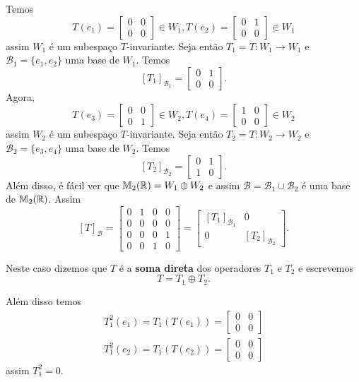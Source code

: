 Temos
\[
    T(e_1) = \begin{bmatrix}
        0 & 0\\
        0 & 0
    \end{bmatrix} \in W_1,
    T(e_2) = \begin{bmatrix}
        0 & 1\\
        0 & 0
    \end{bmatrix} \in W_1
\]
assim $W_1$ \'e um subespa\c{c}o $T$-invariante. Seja ent\~ao $T_1 = T : W_1 \to W_1$ e $\mathcal{B}_1 = \{e_1, e_2\}$ uma base de $W_1$. Temos
\[
    [T_1]_{\mathcal{B}_1} = \begin{bmatrix}
        0 & 1\\
        0 & 0
    \end{bmatrix}.
\]
Agora,
\[
    T(e_3) = \begin{bmatrix}
        0 & 0\\
        0 & 1
    \end{bmatrix} \in W_2,
    T(e_4) = \begin{bmatrix}
        1 & 0\\
        0 & 0
    \end{bmatrix} \in W_2
\]
assim $W_2$ \'e um subespa\c{c}o $T$-invariante. Seja ent\~ao $T_2 = T : W_2 \to W_2$ e $\mathcal{B}_2 = \{e_3, e_4\}$ uma base de $W_2$. Temos
\[
    [T_2]_{\mathcal{B}_2} = \begin{bmatrix}
        0 & 1\\
        1 & 0
    \end{bmatrix}.
\]
Al\'em disso, \'e f\'acil ver que $\mathbb{M}_2(\mathbb{R}) = W_1 \oplus W_2$ e assim $\mathcal{B} = \mathcal{B}_1 \cup \mathcal{B}_2$ \'e uma base de $\mathbb{M}_2(\mathbb{R})$. Assim
\[
    [T]_\mathcal{B} = \begin{bmatrix}
        0 & 1 & 0 & 0\\
        0 & 0 & 0 & 0\\
        0 & 0 & 0 & 1\\
        0 & 0 & 1 & 0
    \end{bmatrix} = \begin{bmatrix}
        [T_1]_{\mathcal{B}_1} & 0\\
        0 & [T_2]_{\mathcal{B}_2}
    \end{bmatrix}.
\]

Neste caso dizemos que $T$ \'e a \textbf{soma direta} dos operadores $T_1$ e $T_2$ e escrevemos
\[
    T = T_1 \oplus T_2.
\]

Al\'em disso temos
\begin{align*}
    T_1^2 (e_1) = T_1(T(e_1)) = \begin{bmatrix}
        0 & 0\\
        0 & 0
    \end{bmatrix}\\
    T_1^2 (e_2) = T_1(T(e_2)) = \begin{bmatrix}
        0 & 0\\
        0 & 0
    \end{bmatrix}
\end{align*}
assim $T_1^2 = 0$.

